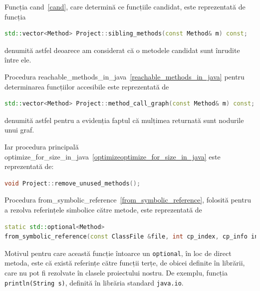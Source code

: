 Funcția cand~\ref{cand}, care determină ce funcțiile candidat, este reprezentată de funcția
\begin{lstlisting}[language=C++]
std::vector<Method> Project::sibling_methods(const Method& m) const;
\end{lstlisting}
denumită astfel deoarece am considerat că o metodele
candidat sunt înrudite între ele.

Procedura reachable\_methods\_in\_java~\ref{reachable_methods_in_java} pentru
determinarea funcțiilor accesibile este reprezentată de
\begin{lstlisting}[language=C++]
std::vector<Method> Project::method_call_graph(const Method& m) const;
\end{lstlisting}
denumită astfel pentru a evidenția faptul că mulțimea returnată sunt nodurile
unui graf.

Iar procedura principală
optimize\_for\_size\_in\_java~\ref{optimizeoptimize_for_size_in_java} este
reprezentată de:
\begin{lstlisting}[language=C++]
void Project::remove_unused_methods();
\end{lstlisting}

Procedura from\_symbolic\_reference~\ref{from_symbolic_reference}, folosită
pentru a rezolva referințele simbolice către metode, este reprezentată de
\begin{lstlisting}[language=C++]
static std::optional<Method>
from_symbolic_reference(const ClassFile &file, int cp_index, cp_info info);
\end{lstlisting}

Motivul pentru care această funcție întoarce un \texttt{optional}, în loc de
direct metoda, este că există referințe către funcții terțe, de
obicei definite în librării, care nu pot fi rezolvate în clasele proiectului nostru.
De exemplu, funcția \texttt{println(String s)}, definită în librăria standard
\texttt{java.io}.


